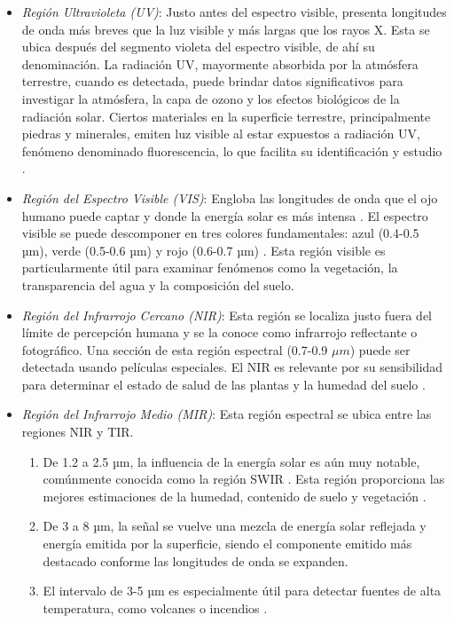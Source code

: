 \begin{itemize}

    \item \textit{Región Ultravioleta (UV)}: Justo antes del espectro visible, presenta longitudes de onda más breves que la luz visible y más largas que los rayos X. Esta se ubica después del segmento violeta del espectro visible, de ahí su denominación. La radiación UV, mayormente absorbida por la atmósfera terrestre, cuando es detectada, puede brindar datos significativos para investigar la atmósfera, la capa de ozono y los efectos biológicos de la radiación solar. Ciertos materiales en la superficie terrestre, principalmente piedras y minerales, emiten luz visible al estar expuestos a radiación UV, fenómeno denominado fluorescencia, lo que facilita su identificación y estudio \cite{canada2007fundamentals}.

    \item \textit{Región del Espectro Visible (VIS)}: Engloba las longitudes de onda que el ojo humano puede captar y donde la energía solar es más intensa \cite{chuvieco2016fundamentals}. El espectro visible se puede descomponer en tres colores fundamentales: azul (0.4-0.5 µm), verde (0.5-0.6 µm) y rojo (0.6-0.7 µm) \cite{canada2007fundamentals}. Esta región visible es particularmente útil para examinar fenómenos como la vegetación, la transparencia del agua y la composición del suelo.

    \item \textit{Región del Infrarrojo Cercano (NIR)}: Esta región se localiza justo fuera del límite de percepción humana y se la conoce como infrarrojo reflectante o fotográfico. Una sección de esta región espectral (0.7-0.9 $\mu m$) puede ser detectada usando películas especiales. El NIR es relevante por su sensibilidad para determinar el estado de salud de las plantas y la humedad del suelo \cite{tempfli2009principles,emery2017introduction}.

    \item \textit{Región del Infrarrojo Medio (MIR)}: Esta región espectral se ubica entre las regiones NIR y TIR.

          \begin{enumerate}
              \item De 1.2 a 2.5 µm, la influencia de la energía solar es aún muy notable, comúnmente conocida como la región SWIR \cite{tempfli2009principles}. Esta región proporciona las mejores estimaciones de la humedad, contenido de suelo y vegetación \cite{chuvieco2016fundamentals}.
              \item De 3 a 8 µm, la señal se vuelve una mezcla de energía solar reflejada y energía emitida por la superficie, siendo el componente emitido más destacado conforme las longitudes de onda se expanden. \item El intervalo de 3-5 µm es especialmente útil para detectar fuentes de alta temperatura, como volcanes o incendios \cite{chuvieco2016fundamentals}.
          \end{enumerate}


\end{itemize}
